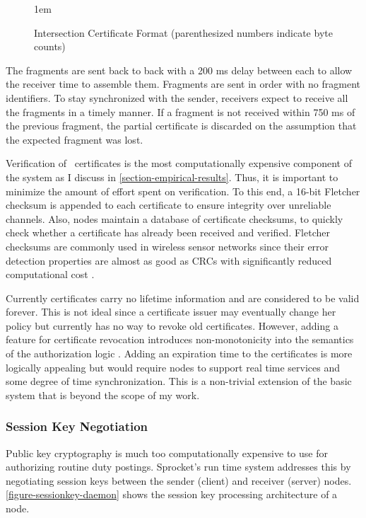 \begin{figure}[t]
  
  \centerline{\raise 1em\box\graph}
  \vspace{2mm}
  \caption{Intersection Certificate Format (parenthesized numbers indicate byte counts)}
  \label{figure-certformats}
\end{figure}

The fragments are sent back to back with a 200 ms delay between each to allow the receiver time
to assemble them. Fragments are sent in order with no fragment identifiers. To stay synchronized
with the sender, receivers expect to receive all the fragments in a timely manner. If a fragment
is not received within 750 ms of the previous fragment, the partial certificate is discarded on
the assumption that the expected fragment was lost.

Verification of \RT\ certificates is the most computationally expensive component of the system
as I discuss in \autoref{section-empirical-results}. Thus, it is important to minimize the
amount of effort spent on verification. To this end, a 16-bit Fletcher checksum is appended to
each certificate to ensure integrity over unreliable channels. Also, nodes maintain a database
of certificate checksums, to quickly check whether a certificate has already been received and
verified. Fletcher checksums are commonly used in wireless sensor networks since their error
detection properties are almost as good as CRCs with significantly reduced computational cost
\cite{fletcher-1982}.

Currently certificates carry no lifetime information and are considered to be valid forever.
This is not ideal since a certificate issuer may eventually change her policy but currently has
no way to revoke old certificates. However, adding a feature for certificate revocation
introduces non-monotonicity into the semantics of the authorization logic
\cite{Li01nonmonotonicity,Rivest:1998:WEC:647502.728327}. Adding an expiration time to the
certificates is more logically appealing but would require nodes to support real time services
and some degree of time synchronization. This is a non-trivial extension of the basic system
that is beyond the scope of my work.

\subsubsection{Session Key Negotiation}

Public key cryptography is much too computationally expensive to use for authorizing routine
duty postings. Sprocket's run time system addresses this by negotiating session keys between the
sender (client) and receiver (server) nodes. \autoref{figure-sessionkey-daemon} shows the
session key processing architecture of a node.

